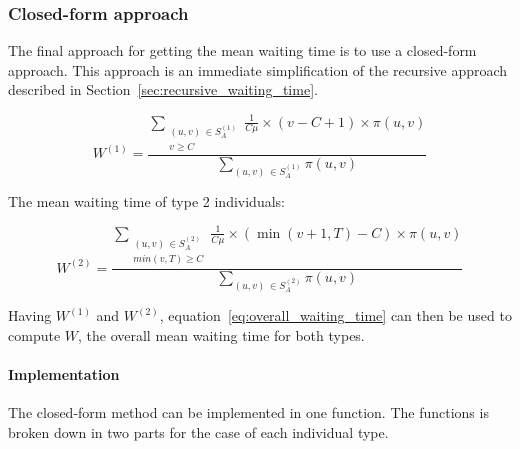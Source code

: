 \subsubsection{Closed-form approach}\label{sec:closed_form_waiting_time}

The final approach for getting the mean waiting time is to use a closed-form
approach.
This approach is an immediate simplification of the recursive approach
described in Section~\ref{sec:recursive_waiting_time}.

\begin{equation} \label{eq:closed_form_waiting_type_1}
    W^{(1)} = \frac{\sum_{\substack{(u,v) \, \in S_A^{(1)} \\ v \geq C}}
    \frac{1}{C \mu} \times (v-C+1) \times \pi(u,v)}{\sum_{(u,v) \,
    \in S_A^{(1)}} \pi(u,v)}
\end{equation}

The mean waiting time of type 2 individuals:

\begin{equation}\label{eq:closed_form_waiting_type_2}
    W^{(2)} = \frac{\sum_{\substack{(u,v) \, \in S_A^{(2)} \\ min(v,T) \geq C}}
    \frac{1}{C \mu} \times (\min(v+1,T)-C) \times \pi(u,v)}{\sum_{(u,v) \,
    \in S_A^{(2)}} \pi(u,v)}
\end{equation}

Having \(W^{(1)}\) and \(W^{(2)}\), equation~\eqref{eq:overall_waiting_time} can
then be used to compute \(W\), the overall mean waiting time for both types.


\paragraph{Implementation}\label{sec:waiting_closed_form_implementation}

The closed-form method can be implemented in one function.
The functions is broken down in two parts for the case of each individual type.

